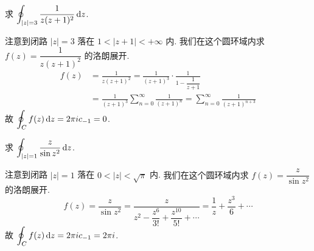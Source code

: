 \begin{example}
	求 $\displaystyle\oint_{|z|=3}\frac1{z(z+1)^2}\,\mathrm{d} z$.
\end{example}

\begin{solution}
	注意到闭路 $|z|=3$ 落在 $1<|z+1|<+\infty$ 内.
	{我们在这个圆环域内求 $f(z)=\dfrac1{z(z+1)^2}$ 的洛朗展开.
		\begin{align*}
		f(z)&=\frac1{z(z+1)^2}=\frac1{(z+1)^3}\cdot\frac1{1-\dfrac1{z+1}}\\
		&{=\frac1{(z+1)^3}\sum_{n=0}^\infty\frac1{(z+1)^n}}
		{=\sum_{n=0}^{\infty}\frac1{(z+1)^{n+3}}}
		\end{align*}故
		$\displaystyle\oint_Cf(z)\,\mathrm{d} z=2\pi i c_{-1}=0$.}
\end{solution}
% 

\begin{example}
	求 $\displaystyle\oint_{|z|=1}\frac{z}{\sin z^2}\,\mathrm{d} z$.
\end{example}

\begin{solution}
	注意到闭路 $|z|=1$ 落在 $0<|z|<\sqrt \pi$ 内.
	{我们在这个圆环域内求 $f(z)=\dfrac{z}{\sin z^2}$ 的洛朗展开.
		\[
		f(z)=\frac{z}{\sin z^2}=
		\frac{z}{z^2-\dfrac{z^6}{3!}+\dfrac{z^{10}}{5!}+\cdots}
		{=\frac1z+\frac{z^3}6+\cdots}
		\]故
		$\displaystyle\oint_Cf(z)\,\mathrm{d} z=2\pi i c_{-1}=2\pi i$.}
\end{solution}
